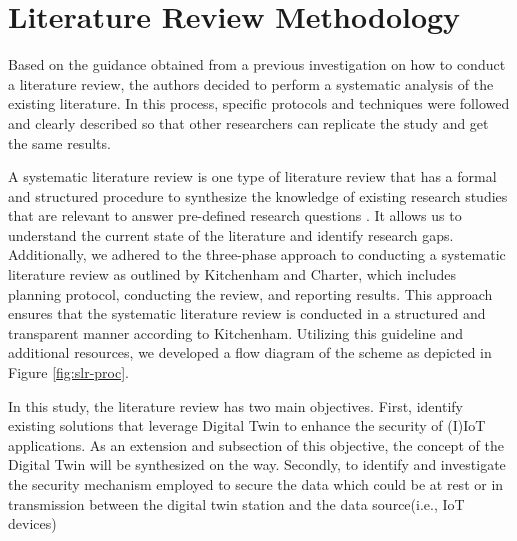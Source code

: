 \chapter{Literature Review Methodology} %

\label{Chapter2} %

Based on the guidance obtained from a previous investigation on how to conduct a literature review, the authors decided to perform a systematic analysis of the existing literature. In this process, specific protocols and techniques were followed and clearly described so that other researchers can replicate the study and get the same results. 


A systematic literature review is one type of literature review that has a formal and structured procedure to synthesize the knowledge of existing research studies that are relevant to answer pre-defined research questions \cite{kofod-petersen_how_nodate, kitchenham_guidelines_2007}. It allows us to understand the current state of the literature and identify research gaps\cite{carrera-rivera_how-conduct_2022}. Additionally, we adhered to the three-phase approach to conducting a systematic literature review as outlined by Kitchenham and Charter\cite{kitchenham_guidelines_2007}, which includes planning protocol, conducting the review, and reporting results. This approach ensures that the systematic literature review is conducted in a structured and transparent manner according to Kitchenham\cite{kitchenham_guidelines_2007}. Utilizing this guideline and additional resources, we developed a flow diagram of the scheme as depicted in Figure \ref{fig:slr-proc}. 

In this study, the literature review has two main objectives. First, identify existing solutions that leverage Digital Twin to enhance the security of (I)IoT applications. As an extension and subsection of this objective, the concept of the Digital Twin will be synthesized on the way. Secondly, to identify and investigate the security mechanism employed to secure the data which could be at rest or in transmission between the digital twin station and the data source(i.e., IoT devices)


